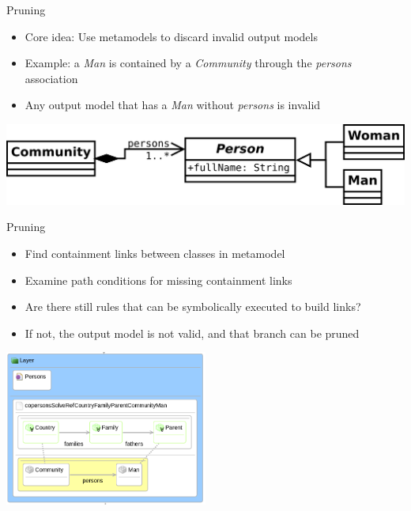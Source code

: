 \documentclass[12pt, handout]{beamer}
\begin{document}
\begin{frame}{Pruning}

\begin{itemize}
\item Core idea: Use metamodels to discard invalid output models
\item Example: a \textit{Man} is contained by a \textit{Community} through the \textit{persons} association
\item Any output model that has a \textit{Man} without \textit{persons} is invalid
\end{itemize}
\begin{center}
\includegraphics[width=\textwidth]{figures/PersonsMM}
\end{center}


\end{frame}

\begin{frame}{Pruning}
\begin{itemize}

\item Find containment links between classes in metamodel
\item Examine path conditions for missing containment links
\item Are there still rules that can be symbolically executed to build links?
\item If not, the output model is not valid, and that branch can be pruned

\end{itemize}
\begin{center}
\includegraphics[width=0.5\textwidth]{figures/copersonsMan}
\end{center}

\end{frame}
\end{document}
